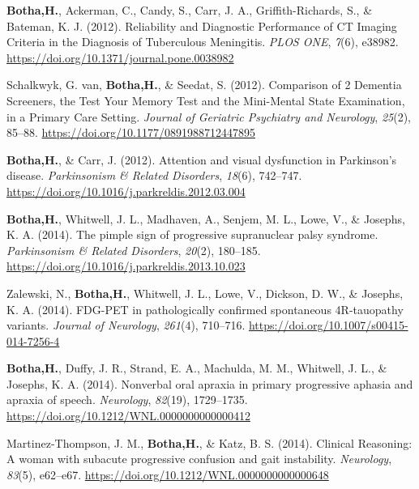 \documentclass[11pt, a4paper]{awesome-cv}
\begin{document}
\leavevmode\hypertarget{ref-botha_reliability_2012}{}%
\textbf{Botha,H.}, Ackerman, C., Candy, S., Carr, J. A.,
Griffith-Richards, S., \& Bateman, K. J. (2012). Reliability and
{Diagnostic} {Performance} of {CT} {Imaging} {Criteria} in the
{Diagnosis} of {Tuberculous} {Meningitis}. \emph{PLOS ONE}, \emph{7}(6),
e38982. \url{https://doi.org/10.1371/journal.pone.0038982}

\leavevmode\hypertarget{ref-van_schalkwyk_comparison_2012}{}%
Schalkwyk, G. van, \textbf{Botha,H.}, \& Seedat, S. (2012). Comparison
of 2 {Dementia} {Screeners}, the {Test} {Your} {Memory} {Test} and the
{Mini}-{Mental} {State} {Examination}, in a {Primary} {Care} {Setting}.
\emph{Journal of Geriatric Psychiatry and Neurology}, \emph{25}(2),
85--88. \url{https://doi.org/10.1177/0891988712447895}

\leavevmode\hypertarget{ref-botha_attention_2012}{}%
\textbf{Botha,H.}, \& Carr, J. (2012). Attention and visual dysfunction
in {Parkinson}'s disease. \emph{Parkinsonism \& Related Disorders},
\emph{18}(6), 742--747.
\url{https://doi.org/10.1016/j.parkreldis.2012.03.004}

\leavevmode\hypertarget{ref-botha_pimple_2014}{}%
\textbf{Botha,H.}, Whitwell, J. L., Madhaven, A., Senjem, M. L., Lowe,
V., \& Josephs, K. A. (2014). The pimple sign of progressive
supranuclear palsy syndrome. \emph{Parkinsonism \& Related Disorders},
\emph{20}(2), 180--185.
\url{https://doi.org/10.1016/j.parkreldis.2013.10.023}

\leavevmode\hypertarget{ref-zalewski_fdg-pet_2014}{}%
Zalewski, N., \textbf{Botha,H.}, Whitwell, J. L., Lowe, V., Dickson, D.
W., \& Josephs, K. A. (2014). {FDG}-{PET} in pathologically confirmed
spontaneous {4R}-tauopathy variants. \emph{Journal of Neurology},
\emph{261}(4), 710--716. \url{https://doi.org/10.1007/s00415-014-7256-4}

\leavevmode\hypertarget{ref-botha_nonverbal_2014}{}%
\textbf{Botha,H.}, Duffy, J. R., Strand, E. A., Machulda, M. M.,
Whitwell, J. L., \& Josephs, K. A. (2014). Nonverbal oral apraxia in
primary progressive aphasia and apraxia of speech. \emph{Neurology},
\emph{82}(19), 1729--1735.
\url{https://doi.org/10.1212/WNL.0000000000000412}

\leavevmode\hypertarget{ref-martinez-thompson_clinical_2014}{}%
Martinez-Thompson, J. M., \textbf{Botha,H.}, \& Katz, B. S. (2014).
Clinical {Reasoning}: {A} woman with subacute progressive confusion and
gait instability. \emph{Neurology}, \emph{83}(5), e62--e67.
\url{https://doi.org/10.1212/WNL.0000000000000648}
\end{document}

